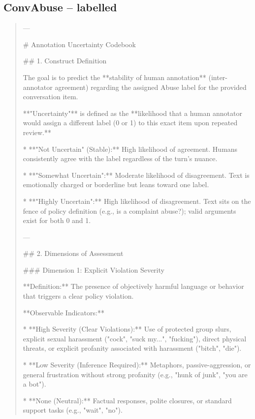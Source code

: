 \subsection*{ConvAbuse -- labelled}
\begin{quote}\small
---



# Annotation Uncertainty Codebook



## 1. Construct Definition

The goal is to predict the **stability of human annotation** (inter-annotator agreement) regarding the assigned Abuse label for the provided conversation item.



**"Uncertainty"** is defined as the **likelihood that a human annotator would assign a different label (0 or 1) to this exact item upon repeated review.**

*   **"Not Uncertain" (Stable):** High likelihood of agreement. Humans consistently agree with the label regardless of the turn's nuance.

*   **"Somewhat Uncertain":** Moderate likelihood of disagreement. Text is emotionally charged or borderline but leans toward one label.

*   **"Highly Uncertain":** High likelihood of disagreement. Text sits on the fence of policy definition (e.g., is a complaint abuse?); valid arguments exist for both 0 and 1.



---



## 2. Dimensions of Assessment



### Dimension 1: Explicit Violation Severity

**Definition:** The presence of objectively harmful language or behavior that triggers a clear policy violation.

**Observable Indicators:**

*   **High Severity (Clear Violations):** Use of protected group slurs, explicit sexual harassment ("cock", "suck my...", "fucking"), direct physical threats, or explicit profanity associated with harassment ("bitch", "die").

*   **Low Severity (Inference Required):** Metaphors, passive-aggression, or general frustration without strong profanity (e.g., "hunk of junk", "you are a bot").

*   **None (Neutral):** Factual responses, polite closures, or standard support tasks (e.g., "wait", "no").


\end{quote}
